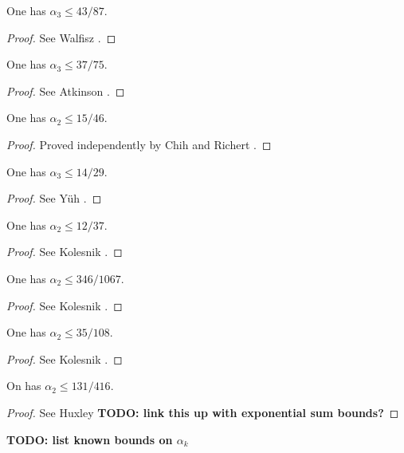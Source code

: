 \begin{lemma}
One has $\alpha_3 \le 43/87$.
\end{lemma}
\begin{proof}
See Walfisz \cite{walfisz_uber_1926}.
\end{proof}

\begin{lemma}
One has $\alpha_3 \le 37/75$.
\end{lemma}
\begin{proof}
See Atkinson \cite{atkinson_divisor_1941}.
\end{proof}


\begin{lemma}
One has $\alpha_2 \le 15/46$. 
\end{lemma}
\begin{proof}
Proved independently by Chih \cite{chih_on_1950} and Richert \cite{richert_verschrfung_1953}.
\end{proof}

\begin{lemma}
One has $\alpha_3 \le 14/29$. 
\end{lemma}
\begin{proof}
See Y\"{u}h \cite{yuh_divisor_1958}.
\end{proof}

\begin{lemma}
One has $\alpha_2 \le 12/37$. 
\end{lemma}
\begin{proof}
See Kolesnik \cite{kolesnik_improvement_1969}.
\end{proof}

\begin{lemma}
One has $\alpha_2 \le 346/1067$. 
\end{lemma}
\begin{proof}
See Kolesnik \cite{kolesnik_1973}.
\end{proof}

\begin{lemma}
One has $\alpha_2 \le 35/108$. 
\end{lemma}
\begin{proof}
See Kolesnik \cite{kolesnik_order_1982}.
\end{proof}


\begin{lemma}
On has $\alpha_2 \le 131/416$.
\end{lemma}
\begin{proof}
See Huxley \cite{huxley_exponential_2003}
{\bf TODO: link this up with exponential sum bounds?}
\end{proof}
{\bf TODO: list known bounds on $\alpha_k$}
